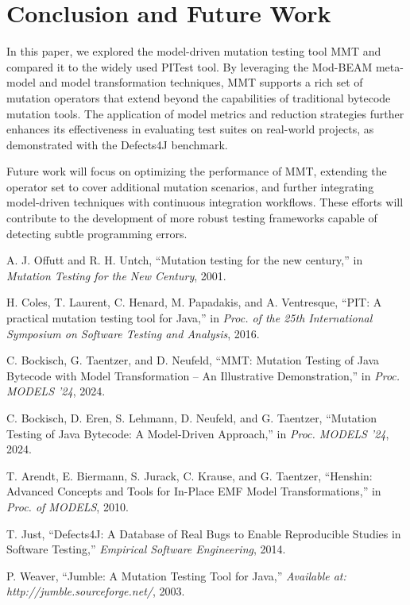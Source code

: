 \documentclass[sigplan, nonacm]{acmart}
\begin{document}
\section{Conclusion and Future Work}
\label{sec:conclusion}
In this paper, we explored the model-driven mutation testing tool MMT and compared it to the widely used PITest tool. By leveraging the Mod-BEAM meta-model and model transformation techniques, MMT supports a rich set of mutation operators that extend beyond the capabilities of traditional bytecode mutation tools. The application of model metrics and reduction strategies further enhances its effectiveness in evaluating test suites on real-world projects, as demonstrated with the Defects4J benchmark.

Future work will focus on optimizing the performance of MMT, extending the operator set to cover additional mutation scenarios, and further integrating model-driven techniques with continuous integration workflows. These efforts will contribute to the development of more robust testing frameworks capable of detecting subtle programming errors.

\begin{thebibliography}{9}
	A. J. Offutt and R. H. Untch, ``Mutation testing for the new century,'' in \textit{Mutation Testing for the New Century}, 2001.

	H. Coles, T. Laurent, C. Henard, M. Papadakis, and A. Ventresque, ``PIT: A practical mutation testing tool for Java,'' in \textit{Proc. of the 25th International Symposium on Software Testing and Analysis}, 2016.

	C. Bockisch, G. Taentzer, and D. Neufeld, ``MMT: Mutation Testing of Java Bytecode with Model Transformation -- An Illustrative Demonstration,'' in \textit{Proc. MODELS '24}, 2024.

	C. Bockisch, D. Eren, S. Lehmann, D. Neufeld, and G. Taentzer, ``Mutation Testing of Java Bytecode: A Model-Driven Approach,'' in \textit{Proc. MODELS '24}, 2024.

	T. Arendt, E. Biermann, S. Jurack, C. Krause, and G. Taentzer, ``Henshin: Advanced Concepts and Tools for In-Place EMF Model Transformations,'' in \textit{Proc. of MODELS}, 2010.

	T. Just, ``Defects4J: A Database of Real Bugs to Enable Reproducible Studies in Software Testing,'' \textit{Empirical Software Engineering}, 2014.

	P. Weaver, ``Jumble: A Mutation Testing Tool for Java,'' \textit{Available at: http://jumble.sourceforge.net/}, 2003.
\end{thebibliography}
\end{document}
